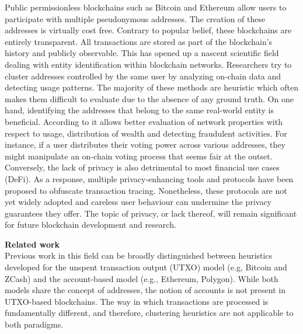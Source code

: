 \documentclass[12pt,a4paper,titlepage,oneside,english]{article}
\begin{document}
Public permissionless blockchains such as Bitcoin \citep{nakamotoBitcoin2008} and Ethereum \citep{buterin2014ethereum} allow users %
 to participate with multiple pseudonymous addresses. The creation of these addresses is virtually cost free. Contrary to popular belief, these blockchains are entirely transparent. All transactions are stored as part of the blockchain's history and publicly observable.
This has opened up a nascent scientific field dealing with entity identification within blockchain networks. Researchers try to cluster addresses controlled by the same user by analyzing on-chain data and detecting usage patterns. The majority of these methods are heuristic which often makes them difficult to evaluate due to the absence of any ground truth. \newline
On one hand, identifying the addresses that belong to the same real-world entity is beneficial. According to \cite{FV:17} it allows better evaluation of network properties with respect to usage, distribution of wealth and detecting fraudulent activities. For instance, if a user distributes their voting power across various addresses, they might manipulate an on-chain voting process that seems fair at the outset. \newline
Conversely, the lack of privacy is also detrimental to most financial use cases (DeFi). As a response, multiple privacy-enhancing tools and protocols have been proposed to obfuscate transaction tracing. 
Nonetheless, these protocols are not yet widely adopted and careless user behaviour can undermine the privacy guarantees they offer. \newline
The topic of privacy, or lack thereof, will remain significant for future blockchain development and research.


\textbf{Related work}\\
Previous work in this field can be broadly distinguished between heuristics developed for the unspent transaction output (UTXO) model (e.g, Bitcoin and ZCash) and the account-based model (e.g., Ethereum, Polygon). While both models share the concept of addresses, the notion of accounts is not present in UTXO-based blockchains. The way in which transactions are processed is fundamentally different, and therefore, clustering heuristics are not applicable to both paradigms.
\end{document}
